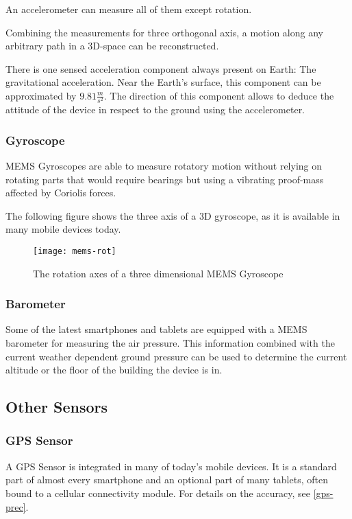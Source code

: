 An accelerometer can measure all of them except rotation.

Combining the measurements for three orthogonal axis, a motion along any arbitrary path in a 3D-space can be reconstructed.

There is one sensed acceleration component always present on Earth: The gravitational acceleration. Near the Earth's surface, this component can be approximated by \(9.81 \frac{m}{s^2}\). The direction of this component allows to deduce the attitude of the device in respect to the ground using the accelerometer.

\subsubsection*{Gyroscope}

MEMS Gyroscopes are able to measure rotatory motion without relying on rotating parts that would require bearings but using a vibrating proof-mass affected by Coriolis forces. 

The following figure shows the three axis of a 3D gyroscope, as it is available in many mobile devices today.

\begin{figure}[H]
\centering
\texttt{[image: mems-rot]}
\caption{The rotation axes of a three dimensional MEMS Gyroscope}
\end{figure}

\subsubsection*{Barometer}

Some of the latest smartphones and tablets are equipped with a MEMS barometer for measuring the air pressure. This information combined with the current weather dependent ground pressure can be used to determine the current altitude or the floor of the building the device is in. 

\subsection{Other Sensors}

\subsubsection*{GPS Sensor}

A GPS Sensor is integrated in many of today's mobile devices. It is a standard part of almost every smartphone and an optional part of many tablets, often bound to a cellular connectivity module. For details on the accuracy, see \ref{gps-prec}.


